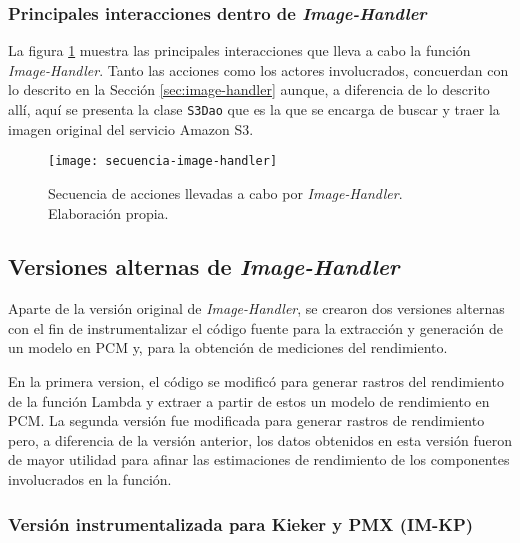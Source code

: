 \subsubsection{Principales interacciones dentro de \emph{Image-Handler}}
La figura \ref{fig:secuencia-image-handler} muestra las principales interacciones que lleva a cabo la función \emph{Image-Handler}. Tanto las acciones como los actores involucrados, concuerdan con lo descrito en la Sección \ref{sec:image-handler} aunque, a diferencia de lo descrito allí, aquí se presenta la clase \texttt{S3Dao} que es la que se encarga de buscar y traer la imagen original del servicio Amazon S3. 
\begin{figure}[h]
  \centering
  \texttt{[image: secuencia-image-handler]}
  \caption[Secuencia de acciones llevadas a cabo por \emph{Image-Handler}]{Secuencia de acciones llevadas a cabo por \emph{Image-Handler}. Elaboración propia.}
  \label{fig:secuencia-image-handler}
\end{figure}

\subsection{Versiones alternas de \emph{Image-Handler}}

Aparte de la versión original de \emph{Image-Handler}, se crearon dos versiones alternas con el fin de instrumentalizar el código fuente para la extracción y generación de un modelo en PCM y, para la obtención de mediciones del rendimiento. 

En la primera version, el código se modificó para generar rastros del rendimiento de la función Lambda y extraer a partir de estos un modelo de rendimiento en PCM. La segunda versión fue modificada para generar rastros de rendimiento pero, a diferencia de la versión anterior, los datos obtenidos en esta versión fueron de mayor utilidad para afinar las estimaciones de rendimiento de los componentes involucrados en la función.

\subsubsection{Versión instrumentalizada para Kieker y PMX (IM-KP)} \label{sec:image-handler-kieker-pmx}

